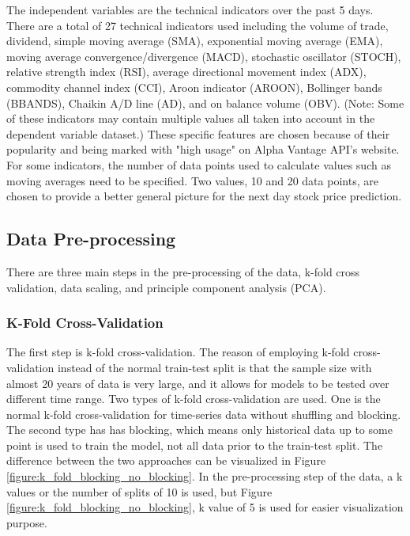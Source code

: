 \documentclass[conference]{IEEEtran}
\begin{document}
The independent variables are the technical indicators over the past 5 days. There are a total of 27 technical indicators used including the volume of trade, dividend, simple moving average (SMA), exponential moving average (EMA), moving average convergence/divergence (MACD), stochastic oscillator (STOCH), relative strength index (RSI), average directional movement index (ADX), commodity channel index (CCI), Aroon indicator (AROON), Bollinger bands (BBANDS), Chaikin A/D line (AD), and on balance volume (OBV). (Note: Some of these indicators may contain multiple values all taken into account in the dependent variable dataset.) These specific features are chosen because of their popularity and being marked with "high usage" on Alpha Vantage API's website. For some indicators, the number of data points used to calculate values such as moving averages need to be specified. Two values, 10 and 20 data points, are chosen to provide a better general picture for the next day stock price prediction. 


\subsection{Data Pre-processing}
There are three main steps in the pre-processing of the data, k-fold cross validation, data scaling, and principle component analysis (PCA).

\subsubsection{K-Fold Cross-Validation}

The first step is k-fold cross-validation. The reason of employing k-fold cross-validation instead of the normal train-test split is that the sample size with almost 20 years of data is very large, and it allows for models to be tested over different time range. Two types of k-fold cross-validation are used. One is the normal k-fold cross-validation for time-series data without shuffling and blocking. The second type has has blocking, which means only historical data up to some point is used to train the model, not all data prior to the train-test split. The difference between the two approaches can be visualized in Figure \ref{figure:k_fold_blocking_no_blocking}. In the pre-processing step of the data, a k values or the number of splits of 10 is used, but Figure \ref{figure:k_fold_blocking_no_blocking}, k value of 5 is used for easier visualization purpose.
\end{document}
